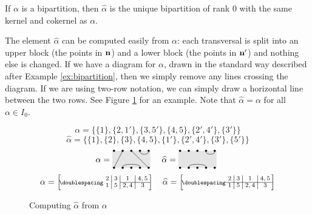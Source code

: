 \begin{definition}
  \label{def:mn-hat}
  If $\alpha$ is a bipartition, then $\widehat\alpha$ is the unique bipartition
  of rank $0$ with the same kernel and cokernel as $\alpha$.
\end{definition}

The element $\widehat\alpha$ can be computed easily from $\alpha$: each
transversal is split into an upper block (the points in $\mathbf{n}$) and a lower block
(the points in $\mathbf{n}'$) and nothing else is changed.  If we have a diagram for
$\alpha$, drawn in the standard way described after Example
\ref{ex:bipartition}, then we simply remove any lines crossing the diagram.  If
we are using two-row notation, we can simply draw a horizontal line between the
two rows.  See Figure \ref{fig:hat} for an example.  Note that $\widehat\alpha =
\alpha$ for all $\alpha \in I_0$.

\begin{figure}[h]
  \centering
  $$\alpha = \big\{
    \{1\}, \{2,1'\}, \{3,5'\}, \{4,5\}, \{2',4'\}, \{3'\}
  \big\}$$
  $$\widehat\alpha = \big\{
    \{1\}, \{2\}, \{3\}, \{4,5\}, \{1'\}, \{2',4'\}, \{3'\}, \{5'\}
  \big\}$$
  $$\alpha = \bipartdiag{\tv21 \tv35 \tc45 \bc24} \quad
  \widehat\alpha = \bipartdiag{\tc45 \bc24}$$
  $$\alpha = \bipart{c|c|c|c}{3-4}{2 & 3 & 1 & 4,5}{1 & 5 & 2,4 & 3} \quad
  \widehat\alpha = \bipart{c|c|c|c}{1-4}{2 & 3 & 1 & 4,5}{1 & 5 & 2,4 & 3}$$
  \caption{Computing $\widehat\alpha$ from $\alpha$}
  \label{fig:hat}
\end{figure}

